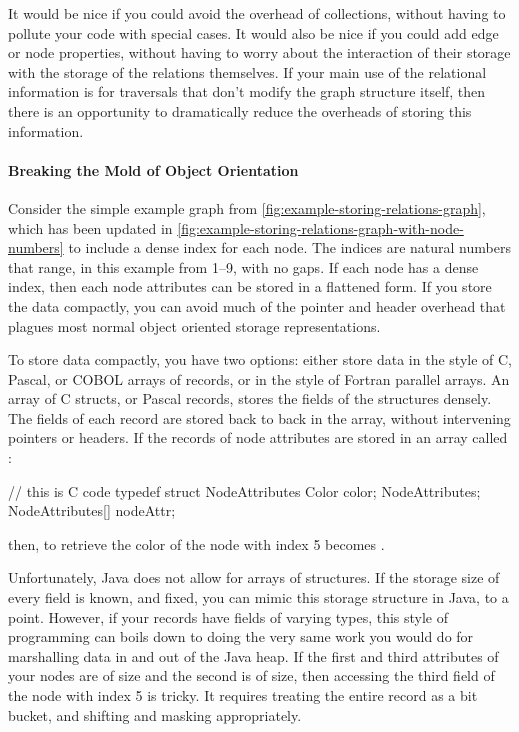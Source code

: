 It would be nice if you could avoid the overhead of collections, without having
to pollute your code with special cases. It would also be nice if you could add
edge or node properties, without having to worry about the interaction of their
storage with the storage of the relations themselves. If your main use of the
relational information is for traversals that don't modify the graph structure
itself, then there is an opportunity to dramatically reduce the overheads of
storing this information.

\paragraph{Breaking the Mold of Object Orientation}

Consider the simple example graph from
\autoref{fig:example-storing-relations-graph}, which has been updated in
\autoref{fig:example-storing-relations-graph-with-node-numbers} to include a
dense index for each node. The indices are natural numbers that range, in this
example from 1--9, with no gaps. If each node has a dense index, then each node
attributes can be stored in a flattened form. If you store the data compactly,
you can avoid much of the pointer and header overhead that plagues most normal
object oriented storage representations.

To store data compactly, you have two options: either store data in the style of
C, Pascal, or COBOL arrays of records, or in the style of Fortran parallel
arrays. An array of C structs, or Pascal records, stores the fields of the structures
densely. The fields of each record are stored back to back in the array, without
intervening pointers or headers. If the records of node attributes are stored in
an array called :
\begin{shortlisting}
// this is C code
typedef struct NodeAttributes {
   Color color;
} NodeAttributes;
NodeAttributes[] nodeAttr;
\end{shortlisting}
then, to retrieve the color of the node
with index 5 becomes .

Unfortunately, Java does not allow for arrays of structures. If the storage size
of every field is known, and fixed, you can mimic this storage structure in Java,
to a point. However, if your records have fields of varying types, this style of
programming can boils down to doing the very same work you would do for
marshalling data in and out of the Java heap. If the first and third attributes
of your nodes are of  size and the second is of  size,
then accessing the third field of the node with index 5 is tricky. It requires
treating the entire record as a bit bucket, and shifting and masking
appropriately.

